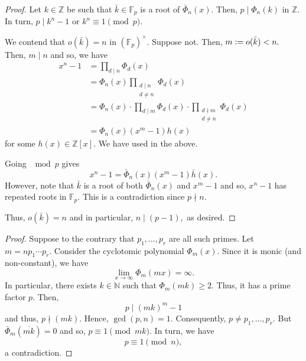 \pequivonemodn*\label{lem:pequivonemodn2}
\begin{flushright}\hyperref[lem:pequivonemodn]{\upsym}\end{flushright}
\begin{proof}
    Let $k \in \mathbb{Z}$ be such that $\bar{k} \in \mathbb{F}_p$ is a root of $\bar{\Phi}_n(x).$ Then, $p \mid \Phi_n(k)$ in $\mathbb{Z}.$ In turn, $p \mid k^n - 1$ or $k^n \equiv 1 \pmod{p}.$

    We contend that $o(\bar{k}) = n$ in $(\mathbb{F}_p)^\times.$ Suppose not. Then, $m \vcentcolon= o(\bar{k}) < n.$ Then, $m \mid n$ and so, we have
    \begin{align*} 
        x^n - 1 &= \prod_{d \mid n} \Phi_d(x)\\
        &= \Phi_n(x) \prod_{\substack{d \mid n \\ d \neq n}} \Phi_d(x) \\
        &= \Phi_n(x) \cdot \prod_{d \mid m} \Phi_d(x) \cdot \prod_{\substack{d \nmid m \\ d \neq n}} \Phi_d(x)\\
        &= \Phi_n(x) (x^m - 1) h(x)
    \end{align*}
    for some $h(x) \in \mathbb{Z}[x].$ We have used  in the above.

    Going $\mod p$ gives
    \begin{equation*} 
        x^n - 1 = \bar{\Phi}_n(x) (x^m - 1) \bar{h}(x).
    \end{equation*}
    However, note that $\bar{k}$ is a root of both $\bar{\Phi}_n(x)$ and $x^m - 1$ and so, $x^n - 1$ has repeated roots in $\mathbb{F}_p.$ This is a contradiction since $p \nmid n.$

    Thus, $o(\bar{k}) = n$ and in particular, $n \mid (p - 1),$ as desired.
\end{proof}

\infprimesmodone*\label{thm:infprimesmodone2}
\begin{flushright}\hyperref[thm:infprimesmodone]{\upsym}\end{flushright}
\begin{proof}
    Suppose to the contrary that $p_1, \ldots, p_r$ are all such primes. Let $m = np_1 \cdots p_r.$ Consider the cyclotomic polynomial $\Phi_m(x).$ Since it is monic (and non-constant), we have
    \begin{equation*} 
        \lim_{x\to \infty} \Phi_m(mx) = \infty.
    \end{equation*}
    In particular, there exists $k \in \mathbb{N}$ such that $\Phi_m(mk) \ge 2.$ Thus, it has a prime factor $p.$ Then,
    \begin{equation*} 
        p \mid (mk)^m - 1
    \end{equation*}
    and thus, $p \nmid (mk).$ Hence, $\gcd(p, n) = 1.$ Consequently, $p \neq p_1, \ldots, p_r.$ But $\bar{\Phi}_m(\overline{mk}) = 0$ and so, $p \equiv 1 \pmod{mk}.$ In turn, we have
    \begin{equation*} 
        p \equiv 1 \pmod{n},
    \end{equation*}
    a contradiction.
\end{proof}

